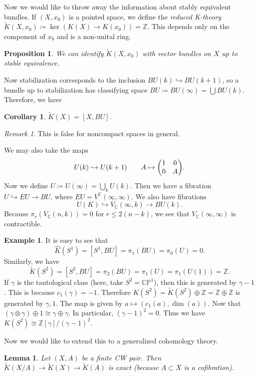 \documentclass[leqno, openany]{memoir}
\newtheorem{cor}[thm]{Corollary}
\newtheorem{prop}[thm]{Proposition}
\newtheorem{lem}[thm]{Lemma}
\theoremstyle{definition}
\newtheorem{exm}[thm]{Example}
\theoremstyle{remark}
\newtheorem{rmk}[thm]{Remark}
\theoremstyle{plain}
\theoremstyle{definition}
\theoremstyle{remark}
\newcommand{\C}{\mathbb{C}}
\newcommand{\Z}{\mathbb{Z}}
\renewcommand{\P}{\mathbb{P}}
\newcommand{\wt}[1]{\widetilde{#1}}
\newcommand{\wh}[1]{\widehat{#1}}
\begin{document}
Now we would like to throw away the information about stably equivalent
bundles. If $(X, x_0)$ is a pointed space, we define the \textit{reduced
K-theory} $\wt{K}(X, x_0) \coloneqq \ker (K(X) \to K(x_0)) = \Z$. This depends
only on the component of $x_0$ and is a non-unital ring. 

\begin{prop} We can identify $\wt{K}(X, x_0)$ with vector bundles on $X$ up to
stable equivalence.  \end{prop}

Now stabilization corresponds to the inclusion $BU(k) \hookrightarrow BU(k+1)$,
so a bundle up to stabilization has classifying space $BU \coloneqq BU(\infty)
= \bigcup BU(k)$. Therefore, we have

\begin{cor} $\wt{K}(X) = [X, BU]$.  \end{cor}

\begin{rmk} This is false for noncompact spaces in general.  \end{rmk}

We may also take the maps \[ U(k) \hookrightarrow U(k+1) \qquad A \mapsto
\mqty(1 & 0 \\ 0 & A). \] Now we define $U \coloneqq U(\infty) = \bigcup_k
U(k)$. Then we have a fibration $U \hookrightarrow EU \to BU$, where $EU =
V^{\C}(\infty, \infty)$. We also have fibrations \[ U(K) \hookrightarrow
V_{\C}(\infty, k) \to BU(k). \] Because $\pi_r(V_{\C}(n, k)) = 0$ for $r \leq
2(n-k)$, we see that $V_{\C}(\infty, \infty)$ is contractible.

\begin{exm} It is easy to see that \[ \wh{K}(S^1) = [S^1, BU] = \pi_1(BU) =
    \pi_0(U) = 0. \] Similarly, we have \[ \wt{K}(S^2) = [S^2, BU] = \pi_2(BU)
= \pi_1(U) = \pi_1(U(1)) = \Z. \] If $\gamma$ is the tautological class (here,
take $S^2 = \C\P^1$), then this is generated by $\gamma - 1$. This is because
$c_1(\gamma) = -1$. Therefore $K(S^2) = \wt{K}(S^2) \oplus \Z = \Z \oplus \Z$
is generated by $\gamma, 1$. The map is given by $a \mapsto (c_1(a), \dim(a))$.
Now that $(\gamma \otimes \gamma) \oplus 1 \cong \gamma \oplus \gamma$. In
particular, ${(\gamma-1)}^2 = 0$. Thus we have $K(S^2) \cong \Z[\gamma]/{
(\gamma-1) }^2$.  \end{exm}

Now we would like to extend this to a generalized cohomology theory.

\begin{lem} Let $(X, A)$ be a finite CW pair. Then $\wt{K}(X/A) \to \wt{K}(X)
\to \wt{K}(A)$ is exact (because $A \subset X$ is a cofibration).  \end{lem}
\end{document}

